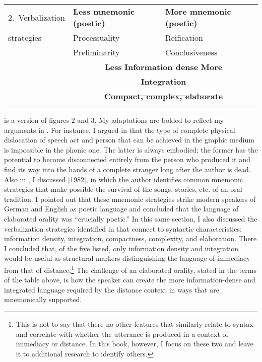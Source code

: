 \begin{table}
{\begin{tabular}{lll}
\mbox{2. Verbalization}      &     \textbf{Less mnemonic (poetic)}   &  \textbf{More mnemonic (poetic)}                               \\
 strategies                               &     Processuality                     &   Reification                                                  \\
                                &   Preliminarity                       &   Conclusiveness                                               \\
                                &     \multicolumn{2}{c}{\textbf{Less}  \hfill    \textbf{Information dense}  \hfill  \textbf{More}  }                                     \\
                                &     \multicolumn{2}{c}{\textbf{Integration}}\\
                                &     \multicolumn{2}{c}{\textbf{\st{Compact, complex, elaborate}}}\\
\lspbottomrule
\end{tabular}
}
\end{table}

 is a version of  figures 2 and 3. My adaptations are bolded to reflect my arguments in .  For instance, I argued in  that the type of complete physical dislocation of speech act and person that can be achieved in the graphic medium is impossible in the phonic one. The latter is always embodied; the former has the potential to become disconnected entirely from the person who produced it and find its way into the hands of a complete stranger long after the author is dead. Also  in , I discussed \citet{Ong2012} [1982], in which the author identifies common mnemonic strategies that make possible the survival of the songs, stories, etc. of an oral tradition. I pointed out that these mnemonic strategies strike modern speakers of German and English as poetic language and concluded that the language of elaborated orality was “crucially poetic.” In this same section, I also discussed the verbalization strategies identified in \citet{KochOesterreicher1985} that connect to syntactic characteristics: information density, integration, compactness, complexity, and elaboration. There I concluded that, of the five listed, only information density and integration would be useful as structural markers distinguishing the language of immediacy from that of distance.\footnote{{This is not to say that there no other features that similarly relate to syntax and correlate with whether the utterance is produced in a context of immediacy or distance. In this book, however, I focus on these two and leave it to additional research to identify others.} } The challenge of an elaborated orality, stated in the terms of the table above, is how the speaker can create the more information-dense and integrated language required by the distance context in ways that are mnemonically supported.

